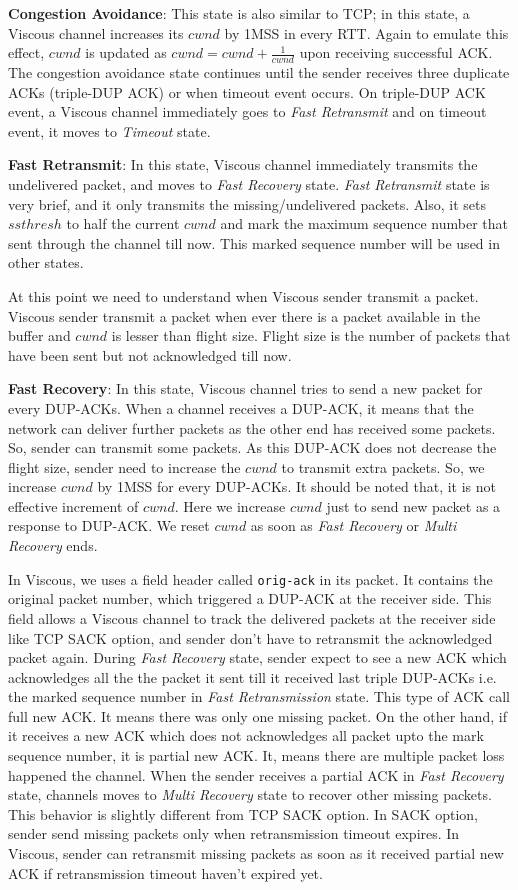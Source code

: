 {\bf Congestion Avoidance}: This state is also similar to TCP; in this state, a Viscous channel increases its $cwnd$ by 1MSS in every RTT. Again to emulate this effect, $cwnd$ is updated as $cwnd= cwnd + \frac{1}{cwnd}$ upon receiving successful ACK. The congestion avoidance state continues until the sender receives three duplicate ACKs (triple-DUP ACK) or when timeout event occurs. On triple-DUP ACK event, a Viscous channel immediately goes to {\it Fast Retransmit} and on timeout event, it moves to {\it Timeout} state.

{\bf Fast Retransmit}: In this state, Viscous channel immediately transmits the undelivered packet, and moves to {\it Fast Recovery} state. {\it Fast Retransmit} state is very brief, and it only transmits the missing/undelivered packets. Also, it sets $ssthresh$ to half the current $cwnd$ and mark the maximum sequence number that sent through the channel till now. This marked sequence number will be used in other states.

At this point we need to understand when Viscous sender transmit a packet. Viscous sender transmit a packet when ever there is a packet available in the buffer and $cwnd$ is lesser than flight size. Flight size is the number of packets that have been sent but not acknowledged till now.

{\bf Fast Recovery}: In this state, Viscous channel tries to send a new packet for every DUP-ACKs. When a channel receives a DUP-ACK, it means that the network can deliver further packets as the other end has received some packets. So, sender can transmit some packets. As this DUP-ACK does not decrease the flight size, sender need to increase the $cwnd$ to transmit extra packets. So, we increase $cwnd$ by 1MSS for every DUP-ACKs. It should be noted that, it is not effective increment of $cwnd$. Here we increase $cwnd$ just to send new packet as a response to DUP-ACK. We reset $cwnd$ as soon as {\it Fast Recovery} or {\it Multi Recovery} ends.

In Viscous, we uses a field header called {\tt orig-ack} in its packet. It contains the original packet number, which triggered a DUP-ACK at the receiver side. This field allows a Viscous channel to track the delivered packets at the receiver side like TCP SACK option, and sender don't have to retransmit the acknowledged packet again. During {\it Fast Recovery} state, sender expect to see a new ACK which acknowledges all the the packet it sent till it received last triple DUP-ACKs i.e. the marked sequence number in {\it Fast Retransmission} state. This type of ACK call full new ACK. It means there was only one missing packet. On the other hand, if it receives a new ACK which does not acknowledges all packet upto the mark sequence number, it is partial new ACK. It, means there are multiple packet loss happened the channel. When the sender receives a partial ACK in {\it Fast Recovery} state, channels moves to {\it Multi Recovery} state to recover other missing packets. This behavior is slightly different from TCP SACK option. In SACK option, sender send missing packets  only when retransmission timeout expires. In Viscous, sender can retransmit missing packets as soon as it received partial new ACK if retransmission timeout haven't expired yet.


